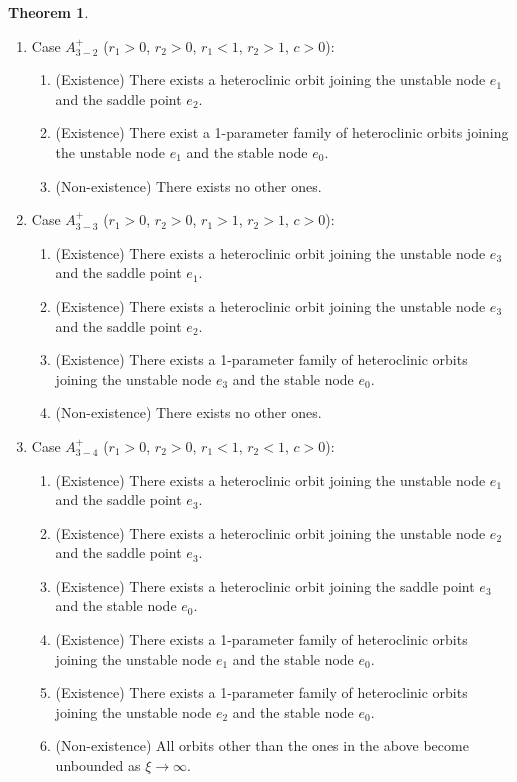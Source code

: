 \documentclass{amsart}
\theoremstyle{definition}
\newtheorem{thm1}{Theorem}[section]
\numberwithin{equation}{section}
\begin{document}
\begin{thm1}
\begin{enumerate}
\begin{enumerate}
  \item (Non-existence) There exists no other ones.
 \end{enumerate}
 \item Case $A_{3-2}^+$ ($r_1>0$, $r_2>0$, $r_1 <1$, $r_2>1$, $c>0$):
 \begin{enumerate}
   \item (Existence) There exists a heteroclinic orbit joining the unstable node $e_1$ and the saddle point $e_2$.
   \item (Existence) There exist a 1-parameter family of heteroclinic orbits joining the unstable node  $e_1$ and the stable node $e_0$.
  \item (Non-existence) There exists no other ones.
 \end{enumerate} 
 \item Case $A_{3-3}^+$ ($r_1>0$, $r_2>0$, $r_1>1$, $r_2>1$, $c>0$):
 \begin{enumerate}
 \item (Existence) There exists a heteroclinic orbit joining the unstable node $e_3$ and the saddle point $e_1$.
 \item (Existence) There exists a heteroclinic orbit joining the unstable node $e_3$ and the saddle point $e_2$.
 \item (Existence) There exists a 1-parameter family of heteroclinic orbits joining the unstable node $e_3$ and the stable node $e_0$.
 \item (Non-existence) There exists no other ones.
 \end{enumerate}
 \item Case $A_{3-4}^+$ ($r_1>0$, $r_2>0$, $r_1<1$, $r_2<1$, $c>0$):
 \begin{enumerate}
 \item (Existence) There exists a heteroclinic orbit joining the unstable node $e_1$ and the saddle point $e_3$.
 \item (Existence) There exists a heteroclinic orbit joining the unstable node $e_2$ and the saddle point $e_3$.
 \item (Existence) There exists a heteroclinic orbit joining the saddle point $e_3$ and the stable node $e_0$.
 \item (Existence) There exists a 1-parameter family of heteroclinic orbits joining the unstable node $e_1$ and the stable node $e_0$.
 \item (Existence) There exists a 1-parameter family of heteroclinic orbits joining the unstable node $e_2$ and the stable node $e_0$.
 \item (Non-existence) All orbits other than the ones in the above become unbounded as $\xi \rightarrow \infty$. 

\end{enumerate}
\end{enumerate}
\end{thm1}
\end{document}
